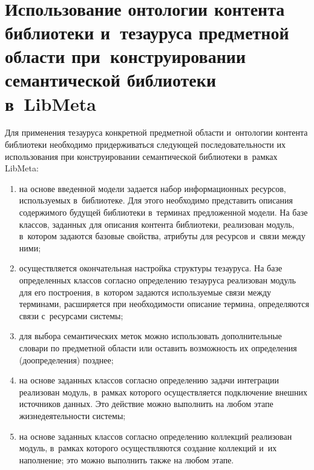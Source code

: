 \begin{multicols}{2}
\begin{figure*} %
\vspace*{1pt}
 \begin{center}
 \mbox{%
 \epsfxsize=155.106mm 
 }
 \end{center}
\vspace*{-9pt}
\vspace*{6pt}
\end{figure*}

\section{Использование онтологии контента библиотеки и~тезауруса
предметной области при~конструировании семантической библиотеки 
в~LibMeta}

     Для применения тезауруса конкретной предметной 
об\-ласти и~онтологии контента биб\-лио\-те\-ки необходимо придерживаться 
сле\-ду\-ющей последовательности их использования при конструировании 
семантической биб\-лио\-те\-ки в~рамках LibMeta:
     \begin{enumerate}[(1)]
\item на основе введенной модели задается набор информационных 
ресурсов, ис\-поль\-зу\-емых в~биб\-лио\-те\-ке. Для этого необходимо пред\-ста\-вить 
описания содержимого будущей биб\-лио\-те\-ки в~терминах предложенной 
модели. На базе классов, заданных для описания контента биб\-лио\-те\-ки, 
реализован модуль, в~котором задаются базовые свойства, атрибуты для 
ресурсов и~связи между ними;
\item осуществляется окончательная настройка структуры тезауруса. На 
базе определенных классов согласно определению тезауруса реализован 
модуль для его по\-стро\-ения, в~котором задаются используемые связи 
между терминами, расширяется при необходимости описание термина, 
определяются связи с~ресурсами сис\-темы; 
\item для выбора семантических меток можно использовать 
дополнительные словари по предметной области или оставить 
возможность их определения (доопределения) позднее; 
\item на основе заданных классов согласно определению задачи 
интеграции реализован модуль, в~рамках которого осуществляется 
подключение внешних источников данных. Это действие можно 
выполнить на любом этапе жизнедеятельности системы;
\item на основе заданных классов согласно определению коллекций 
реализован модуль, в~рамках которого осуществляются создание 
коллекций и~их наполнение; это можно выполнить также на 
любом этапе.
\end{enumerate}


\end{multicols}

